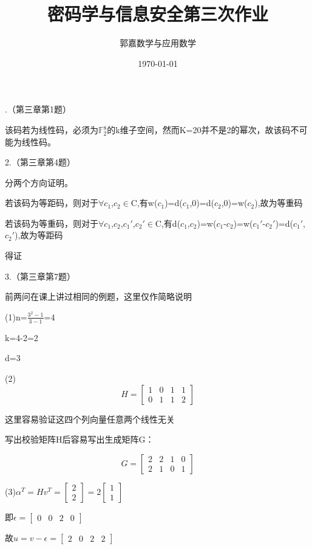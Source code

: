 \documentclass{ctexart}
\title{密码学与信息安全第三次作业}
\author{郭嘉\quad17345019\quad 数学与应用数学}
\date{\today}
\begin{document}
	.（第三章第1题）
	
	该码若为线性码，必须为$\mathbb{F}$$_{2}^{8}$的k维子空间，然而K=20并不是2的幂次，故该码不可能为线性码。
	
	2.（第三章第4题）
	
	分两个方向证明。
	
	若该码为等距码，则对于$\forall$$c_1$,$c_2$$\in$C,有w($c_1$)=d($c_1$,0)=d($c_2$,0)=w($c_2$),故为等重码
	
	若该码为等重码，则对于$\forall$$c_1$,$c_2$,$c_1'$,$c_2'$$\in$C,有d($c_1$,$c_2$)=w($c_1$-$c_2$)=w($c_1'$-$c_2'$)=d($c_1'$,$c_2'$),故为等距码
	
	得证
    
     
	3.（第三章第7题）
	
	前两问在课上讲过相同的例题，这里仅作简略说明
	
	(1)n=$\frac{3^2-1}{3-1}$=4
	
	k=4-2=2
	
	d=3
	
	(2)$$H=
	\begin{bmatrix}
	1 & 0 & 1 & 1\\
	0 & 1 & 1 & 2 
	\end{bmatrix} 
	$$
	
	这里容易验证这四个列向量任意两个线性无关
	
	写出校验矩阵H后容易写出生成矩阵G：
	
	$$G=
	\begin{bmatrix}
	2 & 2 & 1 & 0\\
	2 & 1 & 0 & 1 
	\end{bmatrix} 
	$$
	
	(3)$\alpha^T=Hv^T=
	\begin{bmatrix}
	2 \\
	2  
	\end{bmatrix} 
	=2\begin{bmatrix}
	1 \\
	1  
	\end{bmatrix} $
	
	即$\epsilon=\begin{bmatrix}
	0 & 0 & 2 & 0
	\end{bmatrix} $
	
	故$u=v-\epsilon=\begin{bmatrix}
	2 & 0 & 2 & 2
	\end{bmatrix}$
	
\end{document}

